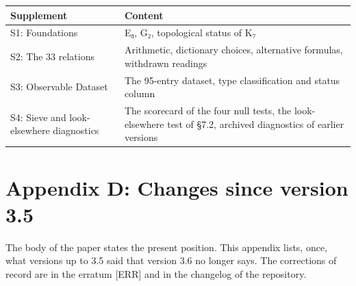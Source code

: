 \documentclass[11pt,a4paper]{article}
\begin{document}
\begin{longtable}[]{@{}
  >{\raggedright\arraybackslash}p{}
  >{\raggedright\arraybackslash}p{}@{}}
\toprule\noalign{}
\begin{minipage}[b]{\linewidth}\raggedright
Supplement
\end{minipage} & \begin{minipage}[b]{\linewidth}\raggedright
Content
\end{minipage} \\
\midrule\noalign{}
\endhead
\bottomrule\noalign{}
\endlastfoot
S1: Foundations & E₈, G₂, topological status of K₇ \\
S2: The 33 relations & Arithmetic, dictionary choices, alternative formulas, withdrawn readings \\
S3: Observable Dataset & The 95-entry dataset, type classification and status column \\
S4: Sieve and look-elsewhere diagnostics & The scorecard of the four null tests, the look-elsewhere test of §7.2, archived diagnostics of earlier versions \\
\end{longtable}

\section{Appendix D: Changes since version 3.5}\label{appendix-d-changes-since-version-3.5}

The body of the paper states the present position. This appendix lists, once, what versions up to 3.5 said that version 3.6 no longer says. The corrections of record are in the erratum {[}ERR{]} and in the changelog of the repository.
\end{document}
